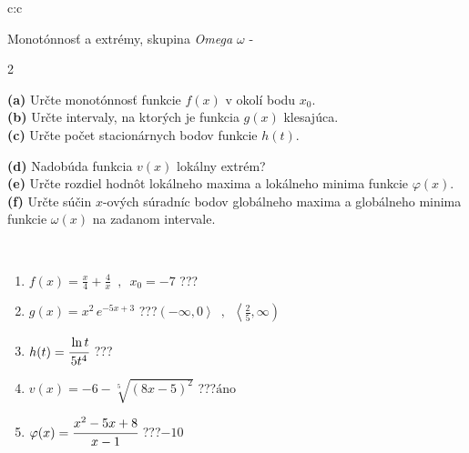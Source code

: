 \documentclass[10pt]{report}
\begin{document}
\newpage
\thispagestyle{empty}
\begin{tabular}{c:c}
\begin{minipage}[c][104.5mm][t]{0.5\linewidth}
\begin{center}
\vspace{7mm}
{\huge Monotónnosť a extrémy, skupina \textit{Omega $\omega$} -}\\[5mm]
\begin{minipage}{0.95\linewidth}
\begin{center}
{\small \begin{multicols}{2} \raggedright
\textbf{(a)} Určte monotónnosť funkcie \(f(x)\) v okolí bodu \(x_0\). \\[1mm]
\textbf{(b)} Určte intervaly, na ktorých je funkcia \(g(x)\) klesajúca. \\[1mm]
\textbf{(c)} Určte počet stacionárnych bodov funkcie \(h(t)\). \par \columnbreak
\textbf{(d)} Nadobúda funkcia \(v(x)\) lokálny extrém? \\[1mm]
\textbf{(e)} Určte rozdiel hodnôt lokálneho maxima a lokálneho minima funkcie \(\varphi(x)\). \\[1mm]
\textbf{(f)} Určte súčin \(x\)-ových súradníc bodov globálneho maxima a globálneho minima funkcie \(\omega(x)\) na zadanom intervale. \\[1mm]
\end{multicols}
}
\end{center}
\end{minipage}
\\[4mm]
\begin{minipage}{0.79\linewidth}
\begin{center}
\begin{varwidth}{\linewidth}
\begin{enumerate}
\normalsize
\item $f(x)=\frac{x}{4}+\frac{4}{x} \enspace , \enspace x_0=-7$\quad \dotfill\; ???\;\dotfill \quad {}
\item $g(x)=x^2\, e^{-5x+3}$\quad \dotfill\; ???\;\dotfill \quad $\left(-\infty , 0\right\rangle\enspace , \enspace \left\langle\frac{2}{5} , \infty\right)$
\item $h(t)=\cfrac{\ln t}{5t^4}$\quad \dotfill\; ???\;\dotfill {}
\item $v(x)=-6-\sqrt[5]{(8x-5)^2}$\quad \dotfill\; ???\;\dotfill \quad $\text{áno}$
\item $\varphi(x)=\cfrac{x^2-5x+8}{x-1}$\quad \dotfill\; ???\;\dotfill \quad $-10$

\end{enumerate}
\end{varwidth}
\end{center}
\end{minipage}
\end{center}
\end{minipage}
\end{tabular}
\end{document}
